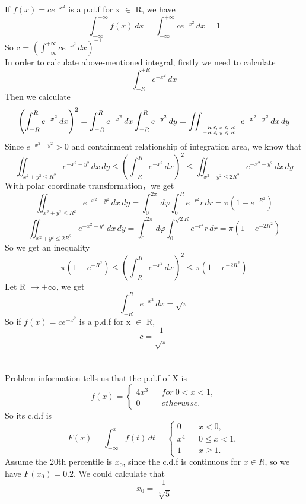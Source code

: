 \documentclass[10.5pt]{article}
\begin{document}
\section{}
If $f(x) = ce^{-x^2}$ is a p.d.f for x $\in $ R, we have $$\int_{-\infty}^{+\infty} f(x) \,dx = \int_{-\infty}^{+\infty} ce^{-x^2} \,dx = 1$$\indent
So c = $\left(\int_{-\infty}^{+\infty} ce^{-x^2} \,dx\right)^{-1}$\\\indent
In order to calculate above-mentioned integral, firstly we need to calculate $$\int_{-R}^{+R} e^{-x^2} \,dx$$\indent
Then we calculate
\begin{equation}
    \left(\int_{-R}^{R} e^{-x^2} \,dx\right)^2 = \int_{-R}^{R} e^{-x^2} \,dx \int_{-R}^{R} e^{-y^2} \,dy =\iint_{\mbox{\tiny$
    \begin{array}{c}
        -R\leqslant x\leqslant R\\
        -R\leqslant y\leqslant R
    \end{array}$}} 
    e^{-x^2-y^2}\,dx\,dy
\end{equation}\indent
Since $e^{-x^2-y^2} > 0$ and containment relationship of integration area, we know that$$\iint_{x^2+y^2\leqslant R^2}e^{-x^2-y^2} \,dx\,dy \leqslant \left(\int_{-R}^{R} e^{-x^2} \,dx\right)^2 \leqslant \iint_{x^2+y^2\leqslant 2R^2}e^{-x^2-y^2} \,dx\,dy$$\indent
With polar coordinate transformation，we get$$\iint_{x^2+y^2\leqslant R^2}e^{-x^2-y^2} \,dx\,dy = \int_{0}^{2\pi} \,d\varphi \int_{0}^{R}e^{-r^2}r\,dr = \pi \left(1-e^{-R^2}\right)$$ $$\iint_{x^2+y^2\leqslant 2R^2}e^{-x^2-y^2} \,dx\,dy = \int_{0}^{2\pi} \,d\varphi \int_{0}^{\sqrt{2}R }e^{-r^2}r\,dr = \pi \left(1-e^{-2R^2}\right)$$\indent
So we get an inequality$$\pi \left(1-e^{-R^2}\right) \leqslant \left(\int_{-R}^{R} e^{-x^2} \,dx\right)^2 \leqslant \pi \left(1-e^{-2R^2}\right)$$\indent
Let R $\rightarrow +\infty$, we get $$\int_{-R}^{R} e^{-x^2} \,dx = \sqrt{\pi}$$\indent
So if $f(x) = ce^{-x^2}$ is a p.d.f for x $\in $ R, $$c = \frac{1}{\sqrt{\pi}}$$

\section{}
Problem information tells us that the p.d.f of X is$$f(x) = \left\{
    \begin{array}{rcl}
        4x^3 & & for~0 < x < 1,\\
        0 & & otherwise. 
    \end{array}\right.$$\indent
So its c.d.f is $$F(x) = \int_{-\infty}^{x} f(t) \,dt = \left\{
\begin{array}{rcl}
    0 & & x < 0,\\
    x^4 & & 0\leqslant x < 1,\\
    1 & & x \geqslant 1.
\end{array}\right. $$\indent
Assume the 20th percentile is $x_0$, since the c.d.f is continuous for $x\in R$, so we have $F(x_0) = 0.2$. We could calculate that $$x_0 = \frac{1}{\sqrt[4]{5}}$$
\end{document}
